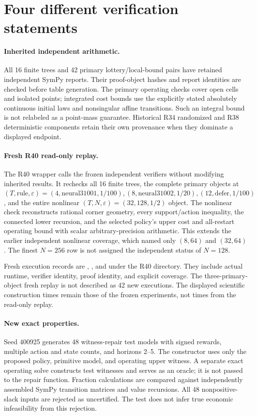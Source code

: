 \section{Four different verification statements}
\paragraph{Inherited independent arithmetic.} All 16 finite trees and 42 primary lottery/local-bound pairs have retained independent SymPy reports. Their proof-object hashes and report identities are checked before table generation. The primary operating checks cover open cells and isolated points; integrated cost bounds use the explicitly stated absolutely continuous initial laws and nonsingular affine transitions. Such an integral bound is not relabeled as a point-mass guarantee. Historical R34 randomized and R38 deterministic components retain their own provenance when they dominate a displayed endpoint.

\paragraph{Fresh R40 read-only replay.} The R40 wrapper calls the frozen independent verifiers without modifying inherited results. It rechecks all 16 finite trees, the complete primary objects at $(T,\text{rule},\varepsilon)=(4,\text{neural31001},1/100),(8,\text{neural31002},1/20),(12,\text{defer},1/100)$, and the entire nonlinear $(T,N,\varepsilon)=(32,128,1/2)$ object. The nonlinear check reconstructs rational corner geometry, every support/action inequality, the connected lower recursion, and the selected policy's upper cost and all-restart operating bound with scalar arbitrary-precision arithmetic. This extends the earlier independent nonlinear coverage, which named only $(8,64)$ and $(32,64)$. The finest $N=256$ row is not assigned the independent status of $N=128$.

Fresh execution records are , , and  under the R40 directory. They include actual runtime, verifier identity, proof identity, and explicit coverage. The three-primary-object fresh replay is not described as 42 new executions. The displayed scientific construction times remain those of the frozen experiments, not times from the read-only replay.

\paragraph{New exact properties.} Seed 400925 generates 48 witness-repair test models with signed rewards, multiple action and state counts, and horizons 2--5. The constructor uses only the proposed policy, primitive model, and operating upper witness. A separate exact operating solve constructs test witnesses and serves as an oracle; it is not passed to the repair function. Fraction calculations are compared against independently assembled SymPy transition matrices and value recursions. All 48 nonpositive-slack inputs are rejected as uncertified. The test does not infer true economic infeasibility from this rejection.

